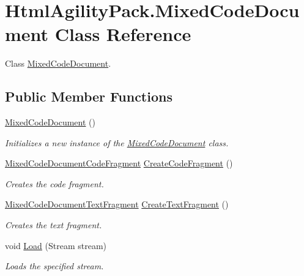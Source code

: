 \hypertarget{class_html_agility_pack_1_1_mixed_code_document}{}\section{Html\+Agility\+Pack.\+Mixed\+Code\+Document Class Reference}
\label{class_html_agility_pack_1_1_mixed_code_document}


Class \hyperlink{class_html_agility_pack_1_1_mixed_code_document}{Mixed\+Code\+Document}.  


\subsection*{Public Member Functions}
\begin{DoxyCompactItemize}
\item 
\hyperlink{class_html_agility_pack_1_1_mixed_code_document_a76edad384aa5101b587b335033abf848}{Mixed\+Code\+Document} ()
\begin{DoxyCompactList}\small\item\em Initializes a new instance of the \hyperlink{class_html_agility_pack_1_1_mixed_code_document}{Mixed\+Code\+Document} class. \end{DoxyCompactList}\item 
\hyperlink{class_html_agility_pack_1_1_mixed_code_document_code_fragment}{Mixed\+Code\+Document\+Code\+Fragment} \hyperlink{class_html_agility_pack_1_1_mixed_code_document_a269d7c74831b0b5191a6211eedaa163f}{Create\+Code\+Fragment} ()
\begin{DoxyCompactList}\small\item\em Creates the code fragment. \end{DoxyCompactList}\item 
\hyperlink{class_html_agility_pack_1_1_mixed_code_document_text_fragment}{Mixed\+Code\+Document\+Text\+Fragment} \hyperlink{class_html_agility_pack_1_1_mixed_code_document_ae20ea4c1e8d8fabdf255052e499d000c}{Create\+Text\+Fragment} ()
\begin{DoxyCompactList}\small\item\em Creates the text fragment. \end{DoxyCompactList}\item 
void \hyperlink{class_html_agility_pack_1_1_mixed_code_document_a216b550a01ccd715a8e4fec262309051}{Load} (Stream stream)
\begin{DoxyCompactList}\small\item\em Loads the specified stream. \end{DoxyCompactList}\item 

\end{DoxyCompactItemize}
